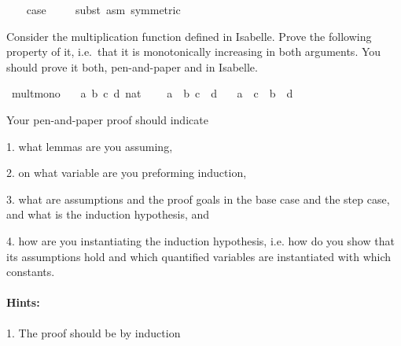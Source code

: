 \begin{isabellebody}
\isanewline
\ \ \isamarkupfalse%
\ {\isacharquery}{\kern0pt}case\isanewline
\ \ \ \ \isamarkupfalse%
{\isacharparenleft}{\kern0pt}subst\ {\isacharparenleft}{\kern0pt}asm{\isacharparenright}{\kern0pt}\ {}{\isacharbrackleft}{\kern0pt}symmetric{\isacharbrackright}{\kern0pt}{\isacharparenright}{\kern0pt}\isanewline
\isanewline
{}\isamarkupfalse%
%
\endisatagproof
{\isafoldproof}%
%
\isadelimproof
%
\endisadelimproof
%
\begin{isamarkuptext}%
%
\end{isamarkuptext}\isamarkuptrue%
%
\begin{isamarkuptext}%
Consider the multiplication function \isa{{\isacharparenleft}{\kern0pt}{\isacharasterisk}{\kern0pt}{\isacharparenright}{\kern0pt}} defined in Isabelle. Prove the following
      property of it, i.e.\ that it is monotonically increasing in both arguments. You should prove
      it both, pen-and-paper and in Isabelle.%
\end{isamarkuptext}\isamarkuptrue%
\isamarkupfalse%
\ mult{\isacharunderscore}{\kern0pt}mono{\isacharcolon}{\kern0pt}\isanewline
\ \ \ a\ b\ c\ d{\isacharcolon}{\kern0pt}{\isacharcolon}{\kern0pt}\ nat\ %
\isanewline
\ \ \ {\isachardoublequoteopen}a\ {\isasymle}\ b{\isachardoublequoteclose}\ {\isachardoublequoteopen}c\ {\isasymle}\ d{\isachardoublequoteclose}\isanewline
\ \ \ {\isachardoublequoteopen}a\ {\isacharasterisk}{\kern0pt}\ c\ {\isasymle}\ b\ {\isacharasterisk}{\kern0pt}\ d{\isachardoublequoteclose}%
\begin{isamarkuptext}%
Your pen-and-paper proof should indicate

 1. what lemmas are you assuming,

 2. on what variable are you preforming induction,

 3. what are assumptions and the proof goals in the base case and the step case, and what is the
    induction hypothesis, and

 4. how are you instantiating the induction hypothesis, i.e. how do you show that its assumptions
    hold and which quantified variables are instantiated with which constants.

\paragraph{Hints:}
 1. The proof should be by induction


\end{isamarkuptext}
\end{isabellebody}
